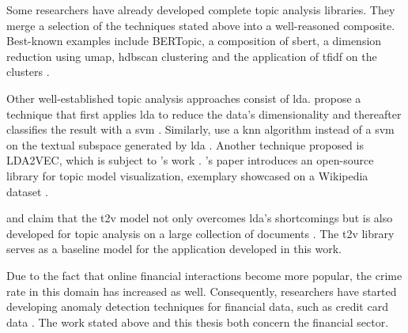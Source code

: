 
Some researchers have already developed complete topic analysis libraries.
They merge a selection of the techniques stated above into a well-reasoned composite.
Best-known examples include BERTopic, a composition of \ac{sbert}, a dimension reduction using \ac{umap}, \ac{hdbscan} clustering and the application of \ac{tfidf} on the clusters \cite{bertopic2022}.

Other well-established topic analysis approaches consist of \ac{lda}.
\citeauthor{lda2008} propose a technique that first applies \ac{lda} to reduce the data's dimensionality and thereafter classifies the result with a \ac{svm} \cite{lda2008}.
Similarly, \citeauthor{LDA2016} use a \ac{knn} algorithm instead of a \ac{svm} on the textual subspace generated by \ac{lda} \cite{LDA2016}.
Another technique proposed is LDA2VEC, which is subject to \citeauthor{evolution_of_topic_modeling2022}'s work \cite{evolution_of_topic_modeling2022}.
\citeauthor{topic_modeling2021}'s paper introduces an open-source library for topic model visualization, exemplary showcased on a Wikipedia dataset \cite{topic_modeling2021}.

\citeauthor{Top2Vec2020} and \citeauthor{Topic2Vec2015} claim that the \ac{t2v} model not only overcomes \ac{lda}'s shortcomings \cite{Top2Vec2020, Topic2Vec2015}
but is also developed for topic analysis on a large collection of documents \cite{Top2Vec2020}.
The \ac{t2v} library serves as a baseline model for the application developed in this work.

Due to the fact that online financial interactions become more popular, the crime rate in this domain has increased as well.
Consequently, researchers have started developing anomaly detection techniques for financial data, such as credit card data 
\cite{credit_f_SOM2006, fd_ARIMA2021, cf_AE2020, AE_RF2021, dt_svm_2012, kaggle_ex2017}.
The work stated above and this thesis both concern the financial sector.
